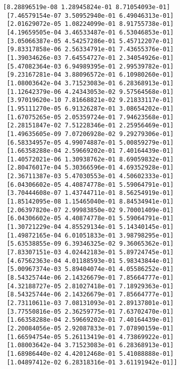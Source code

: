 \documentclass[11pt]{article}
\makeatletter
\newcommand{\boxspacing}{\kern\kvtcb@left@rule\kern\kvtcb@boxsep}
\newcommand{\prompt}[4]{
        \ttfamily\llap{{\color{#2}[#3]:\hspace{3pt}#4}}\vspace{-\baselineskip}
    }
\makeatother
\begin{document}
\begin{Verbatim}[commandchars=\\\{\}]
 [8.28896519e-08 1.28945824e-01 8.71054093e-01]
 [7.46579154e-07 3.50952940e-01 6.49046313e-01]
 [2.01629072e-05 1.08224099e-01 8.91755738e-01]
 [4.19659505e-04 3.46533487e-01 6.53046853e-01]
 [3.05066387e-05 4.54257286e-01 5.45712207e-01]
 [9.83317858e-06 2.56334791e-01 7.43655376e-01]
 [1.39034626e-03 7.64554727e-01 2.34054926e-01]
 [5.47082364e-03 6.94989395e-01 2.99539782e-01]
 [9.23167281e-04 3.88096572e-01 6.10980260e-01]
 [1.08003642e-04 3.71523083e-01 6.28368913e-01]
 [1.12642379e-06 4.24343053e-02 9.57564568e-01]
 [3.97019620e-10 7.81668821e-02 9.21833117e-01]
 [1.95111270e-05 6.91326287e-01 3.08654202e-01]
 [1.67075265e-05 2.05359724e-01 7.94623568e-01]
 [2.28151847e-02 7.51228346e-01 2.25956469e-01]
 [1.49635605e-09 7.07206928e-02 9.29279306e-01]
 [6.58334957e-05 4.99074887e-01 5.00859279e-01]
 [1.66358288e-04 2.59669202e-01 7.40164439e-01]
 [1.40572021e-06 1.30938762e-01 8.69059832e-01]
 [2.80476017e-04 5.30366596e-01 4.69352928e-01]
 [2.36711387e-03 5.47030553e-01 4.50602333e-01]
 [6.04306602e-05 4.40874778e-01 5.59064791e-01]
 [3.70444608e-07 1.43744711e-01 8.56254919e-01]
 [1.85142095e-08 1.15465040e-01 8.84534941e-01]
 [2.06397820e-07 2.99983850e-02 9.70001409e-01]
 [6.04306602e-05 4.40874778e-01 5.59064791e-01]
 [1.30721229e-04 4.85529134e-01 5.14340145e-01]
 [1.49872165e-04 6.01051833e-01 3.98798295e-01]
 [5.63538855e-09 6.39346325e-02 9.36065362e-01]
 [7.83307151e-03 4.02442183e-01 5.89724745e-01]
 [4.67562363e-04 4.01188593e-01 5.98343844e-01]
 [5.00967374e-03 5.89404074e-01 4.05586252e-01]
 [8.54325744e-06 2.14326679e-01 7.85664777e-01]
 [4.32188727e-05 2.81027418e-01 7.18929363e-01]
 [8.54325744e-06 2.14326679e-01 7.85664777e-01]
 [2.73110611e-03 7.08131093e-01 2.89137801e-01]
 [3.77550816e-05 2.36259775e-01 7.63702470e-01]
 [1.66358288e-04 2.59669202e-01 7.40164439e-01]
 [2.20084056e-05 2.92087833e-01 7.07890159e-01]
 [1.66594754e-05 5.26113419e-01 4.73869922e-01]
 [1.08003642e-04 3.71523083e-01 6.28368913e-01]
 [1.68986440e-02 4.42012468e-01 5.41088888e-01]
 [1.04897412e-02 6.28318316e-01 3.61191942e-01]]
    \end{Verbatim}

    \begin{center}
    \end{center}
    { \hspace*{\fill} \\}
    
    \begin{tcolorbox}[breakable, size=fbox, boxrule=1pt, pad at break*=1mm,colback=cellbackground, colframe=cellborder]
\prompt{In}{incolor}{ }{\boxspacing}
\begin{Verbatim}[commandchars=\\\{\}]

\end{Verbatim}
\end{tcolorbox}


    
    
    
\end{document}
